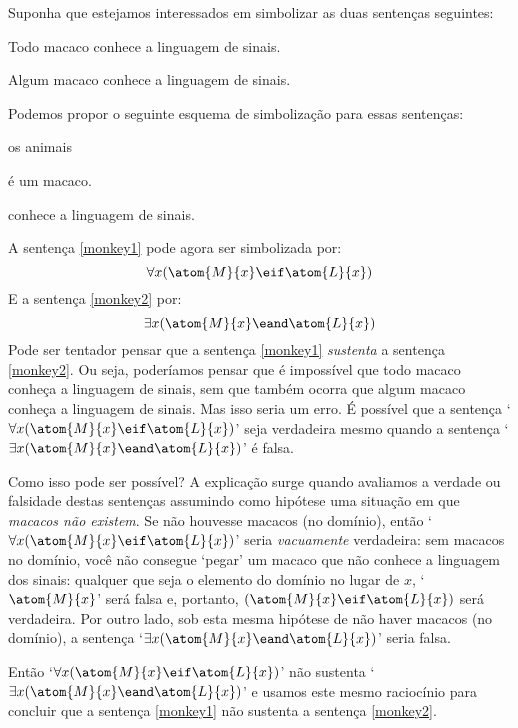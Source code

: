 Suponha que estejamos interessados em  simbolizar as duas sentenças seguintes:
	\begin{earg}
		\item[\ex{monkey1}] Todo macaco conhece a linguagem de sinais.
		\item[\ex{monkey2}] Algum macaco conhece a linguagem de sinais.
	\end{earg}
Podemos propor o seguinte esquema de simbolização para essas sentenças:
	\begin{center}
	\begin{ekey}
		\item[\text{domínio}] os animais
		\item[\atom{M}{x}]  é um macaco.
		\item[\atom{L}{x}]  conhece a linguagem de sinais.
	\end{ekey}
	\end{center}
A sentença \ref{monkey1} pode agora ser simbolizada por:
$$\forall x(\atom{M}{x} \eif \atom{L}{x})$$
E a sentença \ref{monkey2} por:
$$\exists x(\atom{M}{x} \eand \atom{L}{x})$$
Pode ser tentador pensar que a sentença \ref{monkey1} \emph{sustenta} a sentença \ref{monkey2}.
Ou seja, poderíamos pensar que é impossível que todo macaco conheça a linguagem de sinais, sem que também ocorra que algum macaco conheça a linguagem de sinais.
Mas isso seria um erro.
É possível que a sentença `$\forall x(\atom{M}{x} \eif \atom{L}{x})$' seja verdadeira mesmo quando a sentença `$\exists x(\atom{M}{x} \eand \atom{L}{x})$' é falsa.

Como isso pode ser possível?
A explicação surge quando avaliamos a verdade ou falsidade destas sentenças assumindo como hipótese uma situação em que \emph{macacos não existem}.
Se não houvesse macacos (no domínio), então `$\forall x(\atom{M}{x} \eif \atom{L}{x})$' seria \emph{vacuamente} verdadeira:
sem macacos no domínio, você não consegue `pegar' um macaco que não conhece a linguagem dos sinais: qualquer que seja o elemento do domínio no lugar de $x$, `$\atom{M}{x}$' será falsa e, portanto, $(\atom{M}{x} \eif \atom{L}{x})$ será verdadeira.
Por outro lado, sob esta mesma hipótese de não haver macacos (no domínio), a sentença `$\exists x(\atom{M}{x} \eand \atom{L}{x})$' seria falsa.

Então `$\forall x(\atom{M}{x} \eif \atom{L}{x})$' não sustenta `$\exists x(\atom{M}{x} \eand \atom{L}{x})$' e usamos este mesmo raciocínio para concluir que a sentença \ref{monkey1} não sustenta a sentença \ref{monkey2}.

